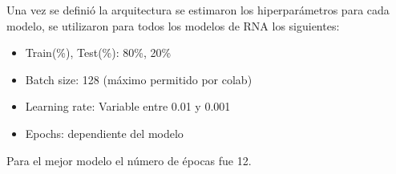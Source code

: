 Una vez se definió la arquitectura se estimaron los hiperparámetros para cada modelo, se utilizaron para todos los modelos de RNA los siguientes:
\begin{itemize}
    \item Train(\%), Test(\%): 80\%, 20\%
    \item Batch size: 128 (máximo permitido por colab)
    \item Learning rate: Variable entre 0.01 y 0.001
    \item Epochs: dependiente del modelo
\end{itemize}
Para el mejor modelo el número de épocas fue 12.

